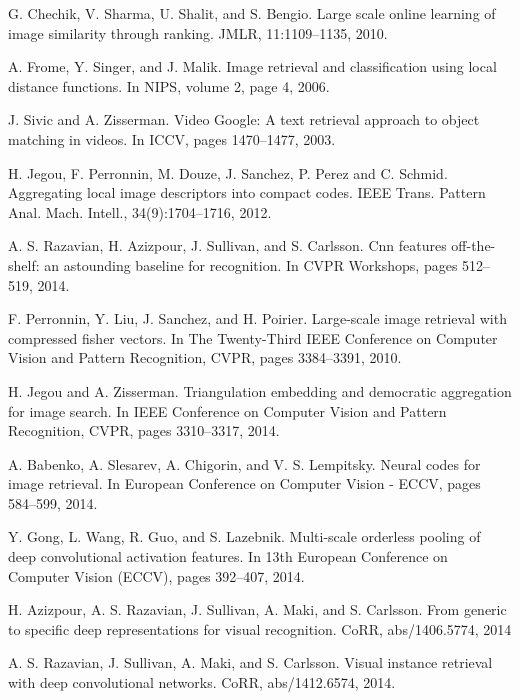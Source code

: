 \documentclass[10pt,twocolumn,letterpaper]{article}
\begin{document}
{\begin{thebibliography}{10}
G. Chechik, V. Sharma, U. Shalit, and S. Bengio. 
\newblock Large scale online learning of image similarity through ranking.
\newblock JMLR, 11:1109–1135, 2010.

A. Frome, Y. Singer, and J. Malik. 
\newblock Image retrieval and classification using local distance functions. 
\newblock In NIPS, volume 2, page 4, 2006.

J. Sivic and A. Zisserman. 
\newblock Video Google: A text retrieval approach to object matching in videos. 
\newblock In ICCV, pages 1470–1477, 2003.

H. Jegou, F. Perronnin, M. Douze, J. Sanchez, P. Perez and C. Schmid.
\newblock Aggregating local image descriptors into compact codes. 
\newblock IEEE Trans. Pattern Anal. Mach. Intell., 34(9):1704–1716, 2012.

A. S. Razavian, H. Azizpour, J. Sullivan, and S. Carlsson.
\newblock Cnn features off-the-shelf: an astounding baseline for recognition.
\newblock In CVPR Workshops, pages 512–519, 2014.

F. Perronnin, Y. Liu, J. Sanchez, and H. Poirier. 
\newblock Large-scale image retrieval with compressed fisher vectors. 
\newblock In The Twenty-Third IEEE Conference on Computer Vision and Pattern Recognition, CVPR, pages 3384–3391, 2010.

H. Jegou and A. Zisserman. 
\newblock Triangulation embedding and democratic aggregation for image search. 
\newblock In IEEE Conference on Computer Vision and Pattern Recognition, CVPR, pages 3310–3317, 2014.

A. Babenko, A. Slesarev, A. Chigorin, and V. S. Lempitsky.
\newblock Neural codes for image retrieval. 
\newblock In European Conference on Computer Vision - ECCV, pages 584–599, 2014.

Y. Gong, L. Wang, R. Guo, and S. Lazebnik. 
\newblock Multi-scale orderless pooling of deep convolutional activation features.
\newblock In 13th European Conference on Computer Vision (ECCV), pages 392–407, 2014.

H. Azizpour, A. S. Razavian, J. Sullivan, A. Maki, and S. Carlsson. 
\newblock From generic to specific deep representations for visual recognition. 
\newblock CoRR, abs/1406.5774, 2014

A. S. Razavian, J. Sullivan, A. Maki, and S. Carlsson. 
\newblock Visual instance retrieval with deep convolutional networks. 
\newblock CoRR, abs/1412.6574, 2014.


\end{thebibliography}}
\end{document}
